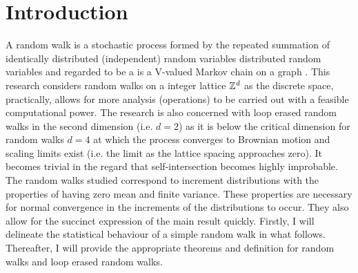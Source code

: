 \documentclass{article}
\begin{document}
\section{Introduction}
	A random walk is a stochastic process formed by the repeated summation of identically distributed (independent) random variables distributed random variables and regarded to be a is a V-valued Markov chain on a graph \cite{schweinsberg2009loop}. This research considers random walks on a integer lattice $\mathbb{Z}^\emph{{d}}$ as the discrete space, practically, allows for more analysis (operations) to be carried out with a feasible computational power. The research is also concerned with loop erased random walks in the second dimension (i.e. $d=2$) as it is below the critical dimension for random walks $d = 4$ at which the process converges to Brownian motion \cite{lawler2010} and scaling limits exist (i.e. the limit as the lattice spacing approaches zero). It becomes trivial in the regard that self-intersection becomes highly improbable. The random walks studied correspond to increment distributions with the properties of having zero mean and finite variance. These properties are necessary for normal convergence in the increments of the distributions to occur. They also allow for the succinct expression of the main result quickly. Firstly, I will delineate the statistical behaviour of a simple random walk in what follows. Thereafter, I will provide the appropriate theorems and definition for random walks and loop erased random walks.
\end{document}
